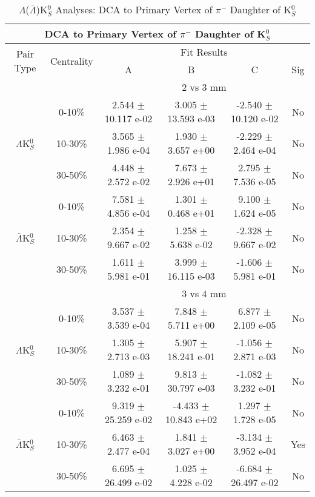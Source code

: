 \documentclass[../AnalysisNoteJBuxton.tex]{subfiles}
\begin{document}
\begin{table}
 \centering
 \begin{tabular}{|c|c|c|c|c|c|}
  \multicolumn{6}{c}{DCA to Primary Vertex of $\pi^{-}$ Daughter of K$^{0}_{S}$} \\
  \hline
  \multirow{2}{*}{Pair Type} & \multirow{2}{*}{Centrality} & \multicolumn{4}{c|}{Fit Results} \\
  \cline{3-6}
   & & A & B & C & Sig \\  
  \hline
  \multicolumn{2}{|c}{} & \multicolumn{4}{c|}{2 vs 3 mm} \\  
  \hline  
  \multirow{3}{*}{$\Lambda$K$^{0}_{S}$}
   &  0-10\% & 2.544 $\pm$ 10.117 e-02 & 3.005 $\pm$ 13.593 e-03 & -2.540 $\pm$ 10.120 e-02 & No \\
   & 10-30\% & 3.565 $\pm$ 1.986 e-04 & 1.930 $\pm$ 3.657 e+00 & -2.229 $\pm$ 2.464 e-04 & No \\
   & 30-50\% & 4.448 $\pm$ 2.572 e-02 & 7.673 $\pm$ 2.926 e+01 & 2.795 $\pm$ 7.536 e-05 & No \\
  \hline
  \multirow{3}{*}{$\bar{\Lambda}$K$^{0}_{S}$}  
   &  0-10\% & 7.581 $\pm$ 4.856 e-04 & 1.301 $\pm$ 0.468 e+01 & 9.100 $\pm$ 1.624 e-05 & No \\
   & 10-30\% & 2.354 $\pm$ 9.667 e-02 & 1.258 $\pm$ 5.638 e-02 & -2.328 $\pm$ 9.667 e-02 & No \\
   & 30-50\% & 1.611 $\pm$ 5.981 e-01 & 3.999 $\pm$ 16.115 e-03 & -1.606 $\pm$ 5.981 e-01 & No \\
  \hline 
  \multicolumn{2}{|c}{} & \multicolumn{4}{c|}{3 vs 4 mm} \\
  \hline  
  \multirow{3}{*}{$\Lambda$K$^{0}_{S}$}   
   &  0-10\% & 3.537 $\pm$ 3.539 e-04 & 7.848 $\pm$ 5.711 e+00 & 6.877 $\pm$ 2.109 e-05 & No \\
   & 10-30\% & 1.305 $\pm$ 2.713 e-03 & 5.907 $\pm$ 18.241 e-01 & -1.056 $\pm$ 2.871 e-03 & No \\
   & 30-50\% & 1.089 $\pm$ 3.232 e-01 & 9.813 $\pm$ 30.797 e-03 & -1.082 $\pm$ 3.232 e-01 & No \\
  \hline  
  \multirow{3}{*}{$\bar{\Lambda}$K$^{0}_{S}$}
   & 0-10\% & 9.319 $\pm$ 25.259 e-02 & -4.433 $\pm$ 10.843 e+02 & 1.297 $\pm$ 1.728 e-05 & No \\
   & 10-30\% & 6.463 $\pm$ 2.477 e-04 & 1.841 $\pm$ 3.027 e+00 & -3.134 $\pm$ 3.952 e-04 & Yes \\
   & 30-50\% & 6.695 $\pm$ 26.499 e-02 & 1.025 $\pm$ 4.228 e-02 & -6.684 $\pm$ 26.497 e-02 & No \\
  \hline
 \end{tabular}
 \caption{$\Lambda$($\bar{\Lambda}$)K$^{0}_{S}$ Analyses: DCA to Primary Vertex of $\pi^{-}$ Daughter of K$^{0}_{S}$}
 \label{tab:DcaToPrimVertexNegPionDaughtOfK0LamK0Full}
\end{table}
\end{document}
